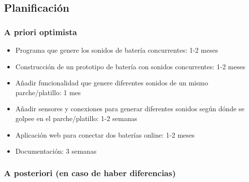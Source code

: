 \documentclass{article}
\begin{document}

    \subsection{Planificación} %
    \label{sub:Planificacion}

        \subsubsection{A priori optimista} %
        \label{ssub:APrioriOptimista}

            \begin{itemize}
                \item
                    Programa que genere los sonidos de batería concurrentes: 1-2 meses
                \item
                    Construcción de un prototipo de batería con sonidos concurrentes: 1-2 meses
                \item
                    Añadir funcionalidad que genere diferentes sonidos de un mismo parche/platillo: 1 mes
                \item
                    Añadir sensores y conexiones para generar diferentes sonidos según dónde se golpee en el
                    parche/platillo: 1-2 semanas
                \item
                    Aplicación web para conectar dos baterías online: 1-2 meses
                \item
                    Documentación: 3 semanas
            \end{itemize}


        \subsubsection{A posteriori (en caso de haber diferencias)} %
        \label{ssub:APosterioriEnCasoDeHaberDiferencias)}


\end{document}
